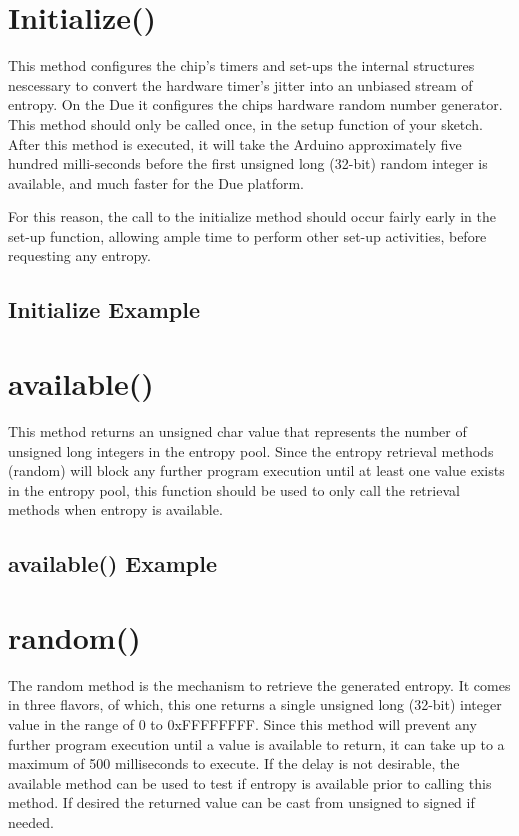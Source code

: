 \documentclass[10pt]{report}
\newcommand{\code}[2]{
 \hrulefill
 \subsection*{#1}
 
 \vspace{2em}
}
\begin{document}
\section{Initialize()}

This method configures the chip's timers and set-ups the internal structures nescessary to convert the 
hardware timer's jitter into an unbiased stream of entropy.  On the Due it configures the chips hardware random
number generator. This method should only be called once, in the setup function of your sketch.  After this method 
is executed, it will take the Arduino approximately five hundred milli-seconds before the first unsigned long (32-bit) 
random integer is available, and much faster for the Due platform.

For this reason, the call to the initialize method should occur fairly early in the set-up function, allowing 
ample time to perform other set-up activities, before requesting any entropy.

\code{Initialize Example}{initialize_example.ino}

\section{available()}

This method returns an unsigned char value that represents the number of unsigned long integers in the entropy 
pool.  Since the entropy retrieval methods (random) will block any further program execution until at least one 
value exists in the entropy pool, this function should be used to only call the retrieval methods when entropy 
is available.

\code{available() Example}{available_example.ino}

\section{random()}

The random method is the mechanism to retrieve the generated entropy.  It comes in three flavors, of which, 
this one returns a single unsigned long (32-bit) integer value in the range of 0 to 0xFFFFFFFF.  Since this 
method will prevent any further program execution until a value is available to return, it can take up to a 
maximum of 500 milliseconds to execute.  If the delay is not desirable, the available method can be used to 
test if entropy is available prior to calling this method.  If desired the returned value can be cast from 
unsigned to signed if needed. 
\end{document}
